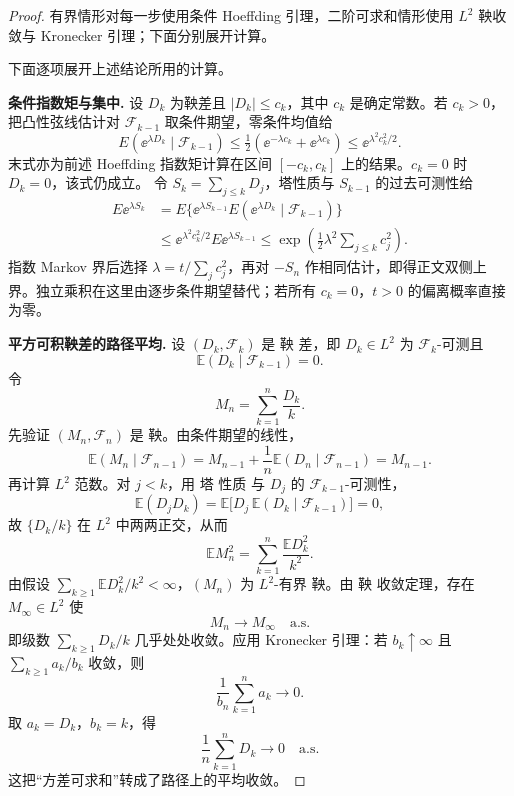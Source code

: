 \begin{proof}
有界情形对每一步使用条件 Hoeffding 引理，二阶可求和情形使用 $L^2$ 鞅收敛与 Kronecker 引理；下面分别展开计算。

下面逐项展开上述结论所用的计算。

\textbf{条件指数矩与集中.}
设 $D_k$ 为鞅差且 $|D_k|\le c_k$，其中 $c_k$ 是确定常数。若 $c_k>0$，把凸性弦线估计对 $\mathcal F_{k-1}$ 取条件期望，零条件均值给
\[
 E(\ee^{\lambda D_k}\mid\mathcal F_{k-1})
 \le\tfrac12(\ee^{-\lambda c_k}+\ee^{\lambda c_k})
 \le \ee^{\lambda^2c_k^2/2}.
\]
末式亦为前述 Hoeffding 指数矩计算在区间 $[-c_k,c_k]$ 上的结果。$c_k=0$ 时 $D_k=0$，该式仍成立。
令 $S_k=\sum_{j\le k}D_j$，塔性质与 $S_{k-1}$ 的过去可测性给
\begin{align*}
 E\ee^{\lambda S_k}
 &=E\{\ee^{\lambda S_{k-1}}E(\ee^{\lambda D_k}\mid\mathcal F_{k-1})\}\\
 &\le \ee^{\lambda^2c_k^2/2}E\ee^{\lambda S_{k-1}}
 \le\exp\!\left(\tfrac12\lambda^2\sum_{j\le k}c_j^2\right).
\end{align*}
指数 Markov 界后选择 $\lambda=t/\sum_jc_j^2$，再对 $-S_n$ 作相同估计，即得正文双侧上界。独立乘积在这里由逐步条件期望替代；若所有 $c_k=0$，$t>0$ 的偏离概率直接为零。

\textbf{平方可积鞅差的路径平均.}
设 $(D_k,\mathcal F_k)$ 是 鞅 差，即 $D_k\in L^2$ 为 $\mathcal F_k$-可测且
\[
\mathbb E(D_k\mid\mathcal F_{k-1})=0.
\]
令
\[
M_n=\sum_{k=1}^n\frac{D_k}{k}.
\]
先验证 $(M_n,\mathcal F_n)$ 是 鞅。由条件期望的线性，
\[
\mathbb E(M_n\mid\mathcal F_{n-1})
=M_{n-1}+\frac1n\mathbb E(D_n\mid\mathcal F_{n-1})
=M_{n-1}.
\]
再计算 $L^2$ 范数。对 $j<k$，用 塔 性质 与 $D_j$ 的 $\mathcal F_{k-1}$-可测性，
\[
\mathbb E(D_jD_k)
=\mathbb E\bigl[D_j\,\mathbb E(D_k\mid\mathcal F_{k-1})\bigr]
=0,
\]
故 $\{D_k/k\}$ 在 $L^2$ 中两两正交，从而
\[
\mathbb E M_n^2
=\sum_{k=1}^n\frac{\mathbb E D_k^2}{k^2}.
\]
由假设 $\sum_{k\ge1}\mathbb E D_k^2/k^2<\infty$，$(M_n)$ 为 $L^2$-有界 鞅。由 鞅 收敛定理，存在 $M_\infty\in L^2$ 使
\[
M_n\to M_\infty
\quad\text{a.s.}
\]
即级数 $\sum_{k\ge1}D_k/k$ 几乎处处收敛。应用 Kronecker 引理：若 $b_k\uparrow\infty$ 且 $\sum_{k\ge1}a_k/b_k$ 收敛，则
\[
\frac1{b_n}\sum_{k=1}^n a_k\to0.
\]
取 $a_k=D_k$，$b_k=k$，得
\[
\frac1n\sum_{k=1}^n D_k\to0
\quad\text{a.s.}
\]
这把“方差可求和”转成了路径上的平均收敛。
\end{proof}

